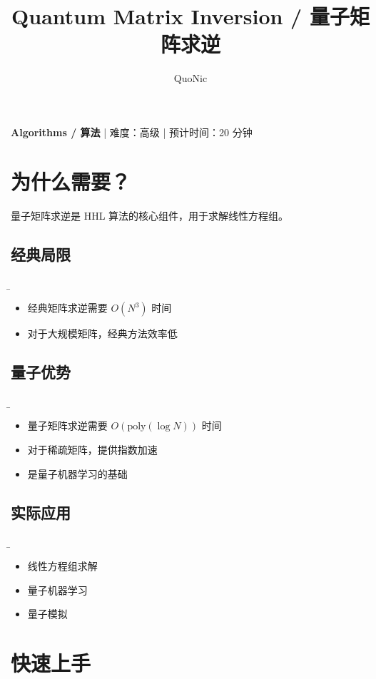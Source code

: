 \documentclass[12pt,a4paper]{article}
\title{Quantum Matrix Inversion / 量子矩阵求逆}
\author{QuoNic}
\date{}
\begin{document}
\maketitle

\begin{center}
\textbf{Algorithms / 算法} | 难度：高级 | 预计时间：20 分钟
\end{center}

\tableofcontents
\newpage

\section{为什么需要？}

量子矩阵求逆是 HHL 算法的核心组件，用于求解线性方程组。

\subsection{经典局限}
\b\begin{itemize}
  \item 经典矩阵求逆需要 $O(N^3)$ 时间
  \item 对于大规模矩阵，经典方法效率低
\end{itemize}

\subsection{量子优势}
\b\begin{itemize}
  \item 量子矩阵求逆需要 $O(\text{poly}(\log N))$ 时间
  \item 对于稀疏矩阵，提供指数加速
  \item 是量子机器学习的基础
\end{itemize}

\subsection{实际应用}
\b\begin{itemize}
  \item 线性方程组求解
  \item 量子机器学习
  \item 量子模拟
\end{itemize}

\section{快速上手}
\end{document}
